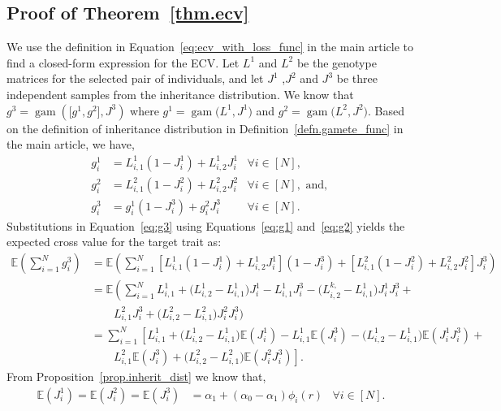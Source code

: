 \documentclass[12pt, a4paper, bibliography=totoc]{scrartcl}
\DeclareMathOperator*{\gam}{gam}
\begin{document}
\subsection*{Proof of Theorem~\ref{thm.ecv}}
We use the definition in Equation~\eqref{eq:ecv_with_loss_func} in the main article to find a closed-form expression for the ECV.  Let $L^1$ and $L^{2}$ be the genotype matrices for the selected pair of individuals, and let $J^1$ ,$J^2$ and $J^3$ be  three independent samples from the inheritance distribution. We know that
$g^{3} = \gam\left(\big[g^{1}, g^{2}\big],J^3\right)$ where $g^{1} = \gam\big(L^{1},J^1\big)$ and $g^{2} = \gam\big(L^{2},J^2\big)$. Based on the definition of inheritance distribution in Definition~\ref{defn.gamete_func} in the main article, we have,
\begin{align}
    g^{1}_i &= L^{1}_{i,1}(1-J_i^1)+L^{1}_{i,2}J_i^1& \forall i \in [N], \label{eq:g1}\\
    g^{2}_i &= L^{2}_{i,1}(1-J_i^2)+L^{2}_{i,2}J_i^2 & \forall i \in [N], \text{ and, } \label{eq:g2}\\
    g^{3}_i &= g^{1}_{i}(1-J_i^3)+g^{2}_{i}J_i^3 &  \forall i \in [N].\label{eq:g3}
\end{align}
Substitutions in Equation~\eqref{eq:g3} using Equations~\eqref{eq:g1} and~\eqref{eq:g2} yields the expected cross value for the target trait as:
\begin{align*}
\nonumber \mathbb{E}\left(\sum_{i=1}^{N}g_i^{3}\right)&=\mathbb{E}\left(\sum_{i=1}^{N}\left[L^{1}_{i,1}(1-J_i^1)+L^{1}_{i,2}J_i^1\right](1-J^3_i)+\left[ L^{2}_{i,1}(1-J_i^2)+L^{2}_{i,2}J_i^2\right]J^3_i\right)\\
\nonumber &=\mathbb{E}\left(\sum_{i=1}^{N}L^{1}_{i,1}+\big(L^{1}_{i,2}-L^{1}_{i,1}\big)J_i^1-L^{1}_{i,1}J^3_i-\big(L^{k,}_{i,2}-L^{1}_{i,1}\big)J^1_iJ^3_i+\right.\\ \nonumber& \qquad 
L^{2}_{i,1}J^3_i+\big(L^{2}_{i,2}-L^{2}_{i,1}\big)J^2_iJ^3_i \Bigg)\\
\nonumber &=\sum_{i=1}^{N}\left[L^{1}_{i,1}+\big(L^{1}_{i,2}-L^{1}_{i,1}\big)\mathbb{E}(J_i^1)-L^{1}_{i,1}\mathbb{E}(J^3_i)-\big(L^{1}_{i,2}-L^{1}_{i,1}\big)\mathbb{E}(J^1_iJ^3_i)+\right.\\
&\qquad \left. L^{2}_{i,1}\mathbb{E}(J^3_i)+\big(L^{2}_{i,2}-L^{2}_{i,1}\big)\mathbb{E}(J^2_iJ^3_i)\right].
\end{align*}
From Proposition~\ref{prop.inherit_dist} we know that,
\begin{align*}
     \mathbb{E}(J_i^1)=\mathbb{E}(J_i^2)=\mathbb{E}(J_i^3) &=     \alpha_1+(\alpha_0-\alpha_1)\phi_i(r) & \forall i \in [N].
\end{align*}
\end{document}
